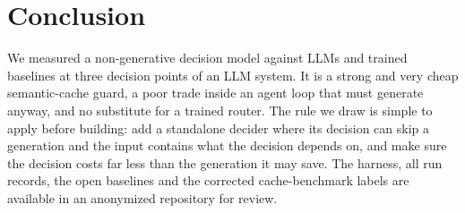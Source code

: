 \section{Conclusion}
\label{sec:conclusion}

We measured a non-generative decision model against LLMs and trained baselines at three decision points of an LLM system.
It is a strong and very cheap semantic-cache guard, a poor trade inside an agent loop that must generate anyway, and no substitute for a trained router.
The rule we draw is simple to apply before building: add a standalone decider where its decision can skip a generation and the input contains what the decision depends on, and make sure the decision costs far less than the generation it may save.
The harness, all run records, the open baselines and the corrected cache-benchmark labels are available in an anonymized repository for review.

